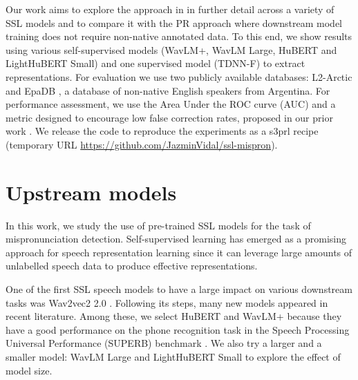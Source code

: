 \documentclass{INTERSPEECH2023}
\begin{document}
Our work aims to explore the approach in \cite{xu2021explore} in further detail across a variety of SSL models and to compare it with the PR approach where downstream model training does not require non-native annotated data. To this end, we show results using various self-supervised models (WavLM+, WavLM Large, HuBERT and LightHuBERT Small) and one supervised model (TDNN-F) to extract representations. 
For evaluation we use two publicly available databases: L2-Arctic \cite{zhao2018l2} and EpaDB \cite{vidal2019epadb}, a database of non-native English speakers from Argentina.
For performance assessment, we use the Area Under the ROC curve (AUC) and a metric designed to encourage low false correction rates, proposed in our prior work \cite{vidal2021phone, sancinetti2022transfer}. We release the code to reproduce the experiments as a s3prl \cite{s3prl} recipe (temporary URL \url{https://github.com/JazminVidal/ssl-mispron}). 

\section{Upstream models}
\label{sec:ssl}
In this work, we study the use of pre-trained SSL models for the task of mispronunciation detection. Self-supervised learning has emerged as a promising approach for speech representation learning since it can leverage large amounts of unlabelled speech data to produce effective representations. %

One of the first SSL speech models to have a large impact on various downstream tasks was Wav2vec2 2.0 \cite{baevski2020wav2vec}. Following its steps, many new models appeared in recent literature. Among these, we select HuBERT \cite{hsu2021hubert} and WavLM+ \cite{wavlm:2022} because they have a good performance on the phone recognition task in the Speech Processing Universal Performance (SUPERB) benchmark \cite{yang2021superb}. We also try a larger and a smaller model: WavLM Large \cite{wavlm:2022} and LightHuBERT Small \cite{wang2022lighthubert} to explore the effect of model size.  
\end{document}
